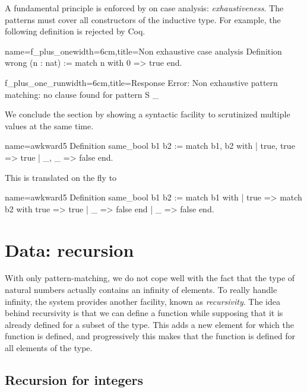 A fundamental principle is enforced by \Coq{} on case analysis:
\emph{exhaustiveness}.  The patterns must cover all constructors of
the inductive type.  For example, the following definition is
rejected by Coq.

\begin{coq}{name=f_plus_one}{width=6cm,title=Non exhaustive case analysis}
Definition wrong (n : nat) :=
  match n with 0 => true end.
$~$
\end{coq}
\begin{coqout}{f_plus_one_run}{width=6cm,title=Response}
Error: Non exhaustive pattern
matching: no clause found for
pattern S _
\end{coqout}

We conclude the section by showing a syntactic facility to scrutinized
multiple values at the same time.

\begin{coq}{name=awkward5}{}
Definition same_bool b1 b2 :=
  match b1, b2 with
  | true, true => true
  | _, _ => false
  end.
\end{coq}

This is translated on the fly to

\begin{coq}{name=awkward5}{}
Definition same_bool b1 b2 :=
  match b1 with
  | true => match b2 with true => true | _ => false end
  | _ => false
  end.
\end{coq}

\section{Data: recursion}

With only pattern-matching, we do not cope well with the fact that the
type  of natural numbers actually contains an infinity of
elements.  To really handle infinity, the \Coq{} system provides another
facility, known as {\em recursivity}.  The idea behind recursivity is
that we can define a function while supposing that it is already
defined for a subset of the type.  This adds a new element for which
the function is defined, and progressively this makes that the
function is defined for all elements of the type.

\subsection{Recursion for integers}

